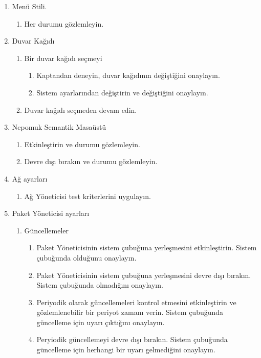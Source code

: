 \documentclass[a4paper,10pt]{article}
\begin{document}
\begin{enumerate}
\begin{enumerate}
    \item Menü Stili.
        \begin{enumerate}
        \item Her durumu gözlemleyin.
        \end{enumerate}

    \item Duvar Kağıdı
        \begin{enumerate}
        \item Bir duvar kağıdı seçmeyi
            \begin{enumerate}
            \item Kaptandan deneyin, duvar kağıdının değiştiğini onaylayın.
            \item Sistem ayarlarından değiştirin ve değiştiğini onaylayın.
            \end{enumerate}
        \item Duvar kağıdı seçmeden devam edin.
        \end{enumerate}

    \item Nepomuk Semantik Masaüstü
        \begin{enumerate}
        \item Etkinleştirin ve durumu gözlemleyin.
        \item Devre dışı bırakın ve durumu gözlemleyin.
        \end{enumerate}

    \item Ağ ayarları
        \begin{enumerate}
        \item Ağ Yöneticisi test kriterlerini uygulayın.
        \end{enumerate}

    \item Paket Yöneticisi ayarları
        \begin{enumerate}
        \item Güncellemeler
            \begin{enumerate}
            \item Paket Yöneticisinin sistem çubuğuna yerleşmesini etkinleştirin.
                Sistem çubuğunda olduğunu onaylayın.
            \item Paket Yöneticisinin sistem çubuğuna yerleşmesini devre dışı bırakın.
                Sistem çubuğunda olmadığını onaylayın.
            \item Periyodik olarak güncellemeleri kontrol etmesini etkinleştirin ve gözlemlenebilir bir periyot zamanı verin.
                Sistem çubuğunda güncelleme için uyarı çıktığını onaylayın.
            \item Peryiodik güncellemeyi devre dışı bırakın.
                Sistem çubuğunda güncelleme için herhangi bir uyarı gelmediğini onaylayın.
            \end{enumerate}
        \end{enumerate}


\end{enumerate}
\end{enumerate}
\end{document}
